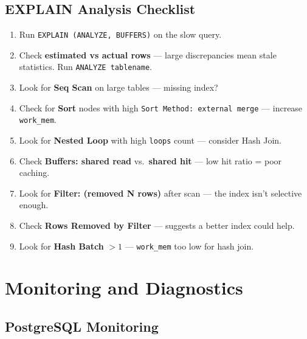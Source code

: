 \documentclass[12pt,a4paper]{article}
\begin{document}
\subsection{EXPLAIN Analysis Checklist}

\begin{tipbox}
\begin{enumerate}
    \item Run \texttt{EXPLAIN (ANALYZE, BUFFERS)} on the slow query.
    \item Check \textbf{estimated vs actual rows} --- large discrepancies mean stale statistics. Run \texttt{ANALYZE tablename}.
    \item Look for \textbf{Seq Scan} on large tables --- missing index?
    \item Check for \textbf{Sort} nodes with high \texttt{Sort Method: external merge} --- increase \texttt{work\_mem}.
    \item Look for \textbf{Nested Loop} with high \texttt{loops} count --- consider Hash Join.
    \item Check \textbf{Buffers: shared read} vs.\ \textbf{shared hit} --- low hit ratio = poor caching.
    \item Look for \textbf{Filter: (removed N rows)} after scan --- the index isn't selective enough.
    \item Check \textbf{Rows Removed by Filter} --- suggests a better index could help.
    \item Look for \textbf{Hash Batch} $> 1$ --- \texttt{work\_mem} too low for hash join.
\end{enumerate}
\end{tipbox}


\section{Monitoring and Diagnostics}

\subsection{PostgreSQL Monitoring}
\end{document}
